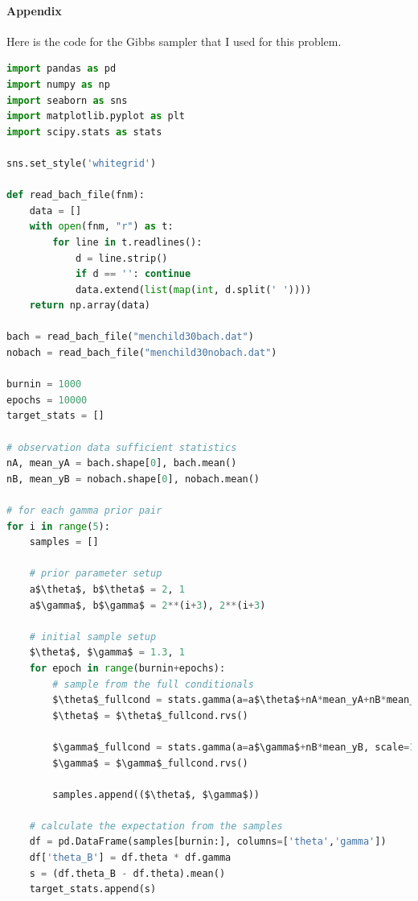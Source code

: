 \documentclass[11pt, letterpaper]{article}
\begin{document}
\paragraph{Appendix}
Here is the code for the Gibbs sampler that I used for this problem.
\begin{lstlisting}[language=Python]
import pandas as pd
import numpy as np
import seaborn as sns
import matplotlib.pyplot as plt
import scipy.stats as stats

sns.set_style('whitegrid')

def read_bach_file(fnm):
    data = []
    with open(fnm, "r") as t:
        for line in t.readlines():
            d = line.strip()
            if d == '': continue
            data.extend(list(map(int, d.split(' '))))
    return np.array(data)
    
bach = read_bach_file("menchild30bach.dat")
nobach = read_bach_file("menchild30nobach.dat")

burnin = 1000
epochs = 10000
target_stats = []

# observation data sufficient statistics
nA, mean_yA = bach.shape[0], bach.mean()
nB, mean_yB = nobach.shape[0], nobach.mean()

# for each gamma prior pair
for i in range(5):
    samples = []

    # prior parameter setup
    a$\theta$, b$\theta$ = 2, 1
    a$\gamma$, b$\gamma$ = 2**(i+3), 2**(i+3)

    # initial sample setup
    $\theta$, $\gamma$ = 1.3, 1
    for epoch in range(burnin+epochs):
        # sample from the full conditionals
        $\theta$_fullcond = stats.gamma(a=a$\theta$+nA*mean_yA+nB*mean_yB, scale=1/(b$\theta$+nA+nB*$\gamma$))
        $\theta$ = $\theta$_fullcond.rvs()

        $\gamma$_fullcond = stats.gamma(a=a$\gamma$+nB*mean_yB, scale=1/(b$\gamma$+nB*$\theta$))
        $\gamma$ = $\gamma$_fullcond.rvs()

        samples.append(($\theta$, $\gamma$))

    # calculate the expectation from the samples
    df = pd.DataFrame(samples[burnin:], columns=['theta','gamma'])
    df['theta_B'] = df.theta * df.gamma
    s = (df.theta_B - df.theta).mean()
    target_stats.append(s)
\end{lstlisting}
\end{document}
